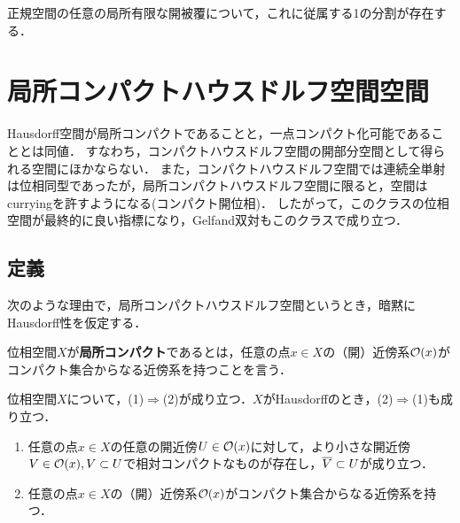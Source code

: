 \documentclass[uplatex,dvipdfmx]{jsreport}
\begin{document}
\begin{theorem}
    正規空間の任意の局所有限な開被覆について，これに従属する1の分割が存在する．
\end{theorem}

\section{局所コンパクトハウスドルフ空間空間}

\begin{tcolorbox}[colframe=ForestGreen, colback=ForestGreen!10!white,breakable,colbacktitle=ForestGreen!40!white,coltitle=black,fonttitle=\bfseries\sffamily,
title=]
    Hausdorff空間が局所コンパクトであることと，一点コンパクト化可能であることとは同値．
    すなわち，コンパクトハウスドルフ空間の開部分空間として得られる空間にほかならない．
    また，コンパクトハウスドルフ空間では連続全単射は位相同型であったが，局所コンパクトハウスドルフ空間に限ると，空間はcurryingを許すようになる(コンパクト開位相)．
    したがって，このクラスの位相空間が最終的に良い指標になり，Gelfand双対もこのクラスで成り立つ．
\end{tcolorbox}

\subsection{定義}

\begin{tcolorbox}[colframe=ForestGreen, colback=ForestGreen!10!white,breakable,colbacktitle=ForestGreen!40!white,coltitle=black,fonttitle=\bfseries\sffamily,
title=]
    次のような理由で，局所コンパクトハウスドルフ空間というとき，暗黙にHausdorff性を仮定する．
\end{tcolorbox}

\begin{definition}
    位相空間$X$が\textbf{局所コンパクト}であるとは，任意の点$x\in X$の（開）近傍系$\mathcal{O}(x)$がコンパクト集合からなる近傍系を持つことを言う．
\end{definition}

\begin{proposition}
    位相空間$X$について，(1)$\Rightarrow$(2)が成り立つ．$X$がHausdorffのとき，(2)$\Rightarrow$(1)も成り立つ．
    \begin{enumerate}
        \item 任意の点$x\in X$の任意の開近傍$U\in\mathcal{O}(x)$に対して，より小さな開近傍$V\in\mathcal{O}(x),V\subset U$で相対コンパクトなものが存在し，$\overline{V}\subset U$が成り立つ．
        \item 任意の点$x\in X$の（開）近傍系$\mathcal{O}(x)$がコンパクト集合からなる近傍系を持つ．
    \end{enumerate}
\end{proposition}
\end{document}
